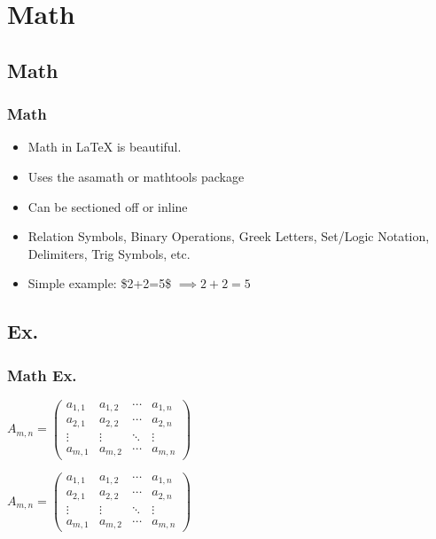 \section{Math}

\subsection{Math}

\begin{frame}
\frametitle{Math}
\begin{itemize}
    \item Math in \LaTeX{} is beautiful.
    \item Uses the asamath or mathtools package
    \item Can be sectioned off or inline
    \item Relation Symbols, Binary Operations, Greek Letters, Set/Logic
        Notation, Delimiters, Trig Symbols, etc.
    \item Simple example: \$2+2=5\$ $\implies 2+2=5$
\end{itemize}
\end{frame}

\subsection{Ex.}

\begin{frame}[allowframebreaks=0.8,fragile]
\frametitle{Math Ex.}
\begin{teX}
\begin{math}
A_{m,n} =
 \begin{pmatrix}
  a_{1,1} & a_{1,2} & \cdots & a_{1,n} \\
  a_{2,1} & a_{2,2} & \cdots & a_{2,n} \\
  \vdots  & \vdots  & \ddots & \vdots  \\
  a_{m,1} & a_{m,2} & \cdots & a_{m,n}
 \end{pmatrix}
 \end{math}
\end{teX}

\framebreak

\begin{math}
A_{m,n} =
 \begin{pmatrix}
  a_{1,1} & a_{1,2} & \cdots & a_{1,n} \\
  a_{2,1} & a_{2,2} & \cdots & a_{2,n} \\
  \vdots  & \vdots  & \ddots & \vdots  \\
  a_{m,1} & a_{m,2} & \cdots & a_{m,n}
 \end{pmatrix}
 \end{math}
\end{frame}


